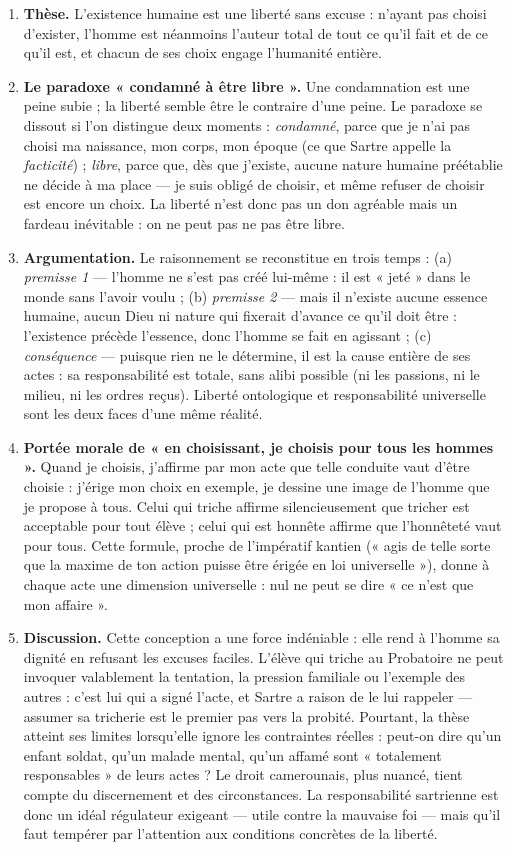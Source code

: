 \documentclass[11pt]{article}
\begin{document}
\begin{corrige}
\begin{enumerate}
\item \textbf{Thèse.} L'existence humaine est une liberté sans excuse : n'ayant pas choisi d'exister, l'homme est néanmoins l'auteur total de tout ce qu'il fait et de ce qu'il est, et chacun de ses choix engage l'humanité entière.
\item \textbf{Le paradoxe « condamné à être libre ».} Une condamnation est une peine subie ; la liberté semble être le contraire d'une peine. Le paradoxe se dissout si l'on distingue deux moments : \emph{condamné}, parce que je n'ai pas choisi ma naissance, mon corps, mon époque (ce que Sartre appelle la \emph{facticité}) ; \emph{libre}, parce que, dès que j'existe, aucune nature humaine préétablie ne décide à ma place — je suis obligé de choisir, et même refuser de choisir est encore un choix. La liberté n'est donc pas un don agréable mais un fardeau inévitable : on ne peut pas ne pas être libre.
\item \textbf{Argumentation.} Le raisonnement se reconstitue en trois temps : (a) \emph{premisse 1} — l'homme ne s'est pas créé lui-même : il est « jeté » dans le monde sans l'avoir voulu ; (b) \emph{premisse 2} — mais il n'existe aucune essence humaine, aucun Dieu ni nature qui fixerait d'avance ce qu'il doit être : l'existence précède l'essence, donc l'homme se fait en agissant ; (c) \emph{conséquence} — puisque rien ne le détermine, il est la cause entière de ses actes : sa responsabilité est totale, sans alibi possible (ni les passions, ni le milieu, ni les ordres reçus). Liberté ontologique et responsabilité universelle sont les deux faces d'une même réalité.
\item \textbf{Portée morale de « en choisissant, je choisis pour tous les hommes ».} Quand je choisis, j'affirme par mon acte que telle conduite vaut d'être choisie : j'érige mon choix en exemple, je dessine une image de l'homme que je propose à tous. Celui qui triche affirme silencieusement que tricher est acceptable pour tout élève ; celui qui est honnête affirme que l'honnêteté vaut pour tous. Cette formule, proche de l'impératif kantien (« agis de telle sorte que la maxime de ton action puisse être érigée en loi universelle »), donne à chaque acte une dimension universelle : nul ne peut se dire « ce n'est que mon affaire ».
\item \textbf{Discussion.} Cette conception a une force indéniable : elle rend à l'homme sa dignité en refusant les excuses faciles. L'élève qui triche au Probatoire ne peut invoquer valablement la tentation, la pression familiale ou l'exemple des autres : c'est lui qui a signé l'acte, et Sartre a raison de le lui rappeler — assumer sa tricherie est le premier pas vers la probité. Pourtant, la thèse atteint ses limites lorsqu'elle ignore les contraintes réelles : peut-on dire qu'un enfant soldat, qu'un malade mental, qu'un affamé sont « totalement responsables » de leurs actes ? Le droit camerounais, plus nuancé, tient compte du discernement et des circonstances. La responsabilité sartrienne est donc un idéal régulateur exigeant — utile contre la mauvaise foi — mais qu'il faut tempérer par l'attention aux conditions concrètes de la liberté.

\end{enumerate}
\end{corrige}
\end{document}
